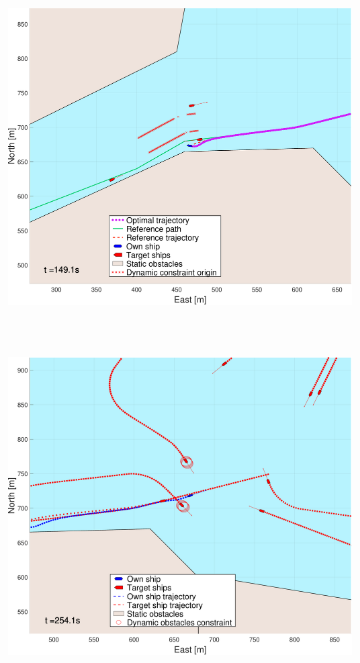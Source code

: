 \begin{figure}[!ht]
    \hfill
    \begin{subfigure}[b]{0.494\textwidth}
        \centering
        \includegraphics[width=\textwidth]{Images/NewFigures/Trheimfjord/_Simple_0fig999_time=150}
        \subcaption{}
    \end{subfigure}
    \hfill
    \\
    \begin{subfigure}[b]{0.494\textwidth}
        \centering
        \includegraphics[width=\textwidth]{Images/NewFigures/Trheimfjord/_Simple_0fig1_time=255}

\end{subfigure}
\end{figure}
